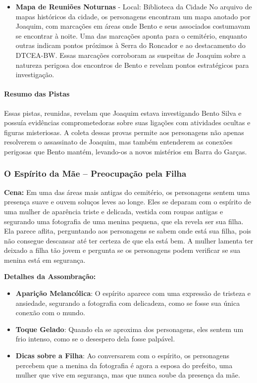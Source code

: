 \begin{itemize}
    \item \textbf{Mapa de Reuniões Noturnas} - Local: Biblioteca da Cidade  
    No arquivo de mapas históricos da cidade, os personagens encontram um mapa anotado por Joaquim, com marcações em áreas onde Bento e seus associados costumavam se encontrar à noite. Uma das marcações aponta para o cemitério, enquanto outras indicam pontos próximos à Serra do Roncador e ao destacamento do DTCEA-BW. Essas marcações corroboram as suspeitas de Joaquim sobre a natureza perigosa dos encontros de Bento e revelam pontos estratégicos para investigação.

\end{itemize}

\paragraph{Resumo das Pistas}

Essas pistas, reunidas, revelam que Joaquim estava investigando Bento Silva e possuía evidências comprometedoras sobre suas ligações com atividades ocultas e figuras misteriosas. A coleta dessas provas permite aos personagens não apenas resolverem o assassinato de Joaquim, mas também entenderem as conexões perigosas que Bento mantém, levando-os a novos mistérios em Barra do Garças.



\subsubsection{O Espírito da Mãe – Preocupação pela Filha}

\textbf{Cena:} Em uma das áreas mais antigas do cemitério, os personagens sentem uma presença suave e ouvem soluços leves ao longe. Eles se deparam com o espírito de uma mulher de aparência triste e delicada, vestida com roupas antigas e segurando uma fotografia de uma menina pequena, que ela revela ser sua filha. Ela parece aflita, perguntando aos personagens se sabem onde está sua filha, pois não consegue descansar até ter certeza de que ela está bem. A mulher lamenta ter deixado a filha tão jovem e pergunta se os personagens podem verificar se sua menina está em segurança. 

\textbf{Detalhes da Assombração:}
\begin{itemize}
    \item \textbf{Aparição Melancólica}: O espírito aparece com uma expressão de tristeza e ansiedade, segurando a fotografia com delicadeza, como se fosse sua única conexão com o mundo.
    \item \textbf{Toque Gelado}: Quando ela se aproxima dos personagens, eles sentem um frio intenso, como se o desespero dela fosse palpável.
    \item \textbf{Dicas sobre a Filha}: Ao conversarem com o espírito, os personagens percebem que a menina da fotografia é agora a esposa do prefeito, uma mulher que vive em segurança, mas que nunca soube da presença da mãe. 
\end{itemize}


